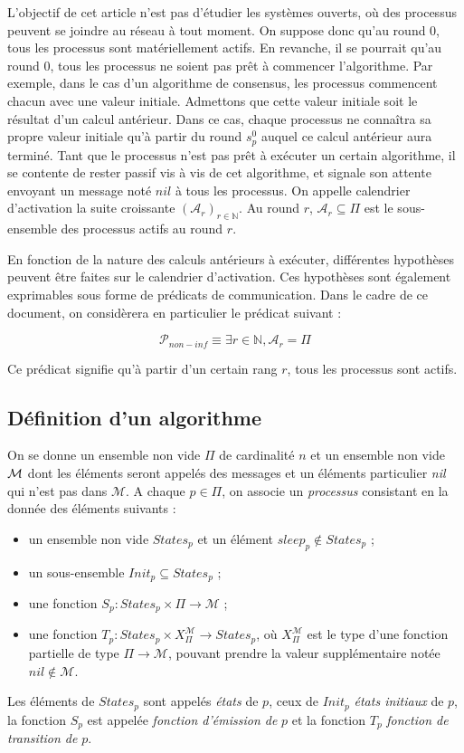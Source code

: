 \documentclass{article}
\begin{document}
L'objectif de cet article n'est pas d'étudier les systèmes ouverts, où des processus peuvent se joindre au réseau à tout moment.
On suppose donc qu'au round 0, tous les processus sont matériellement actifs. En revanche, il se pourrait qu'au round 0, tous les processus ne soient pas prêt à commencer l'algorithme.
Par exemple, dans le cas d'un algorithme de consensus, les processus commencent chacun avec une valeur initiale. Admettons que cette valeur initiale soit le résultat d'un calcul antérieur.
Dans ce cas, chaque processus ne connaîtra sa propre valeur initiale qu'à partir du round $s^0_p$ auquel ce calcul antérieur aura terminé.
Tant que le processus n'est pas prêt à exécuter un certain algorithme, il se contente de rester passif vis à vis de cet algorithme,
et signale son attente envoyant un message noté $nil$ à tous les processus.
On appelle calendrier d'activation la suite croissante $(\mathcal{A}_r)_{r \in \mathds{N}}$. Au round $r$, $\mathcal{A}_r \subseteq \Pi$ est le sous-ensemble des processus actifs au round $r$.

En fonction de la nature des calculs antérieurs à exécuter, différentes hypothèses peuvent être faites sur le calendrier d'activation.
Ces hypothèses sont également exprimables sous forme de prédicats de communication.
Dans le cadre de ce document, on considèrera en particulier le prédicat suivant :

$$\mathcal{P}_{non-inf} \equiv \exists r \in \mathds{N}, \mathcal{A}_r = \Pi$$

Ce prédicat signifie qu'à partir d'un certain rang $r$, tous les processus sont actifs.

\subsection{Définition d'un algorithme}

On se donne un ensemble non vide $\Pi$ de cardinalité $n$ et  un ensemble non vide ${\cal M}$ dont les éléments seront appel\'es des
	messages et un éléments particulier {\em nil} qui n'est pas dans $\mathcal{M}$.
A chaque  $p \in \Pi$,  on associe  un {\em processus} consistant en la donnée des éléments suivants :
	\begin{itemize}
	\item un ensemble non vide $States_p$ et un  \'el\'ement $sleep_p \notin States_p$ ;
	\item un sous-ensemble   $Init_p \subseteq States_p$ ;
	\item une fonction $S_p : States_p \times \Pi \rightarrow \mathcal{M}$ ;
	\item une fonction 
		$T_p : States_p \times X_\Pi^\mathcal{M}
	  \rightarrow States_p$,
	  où  $X_\Pi^\mathcal{M}$ est le type d'une fonction partielle
			de type $\Pi \rightarrow \mathcal{M}$, pouvant prendre la valeur supplémentaire notée $nil \notin \mathcal{M}$.
	\end{itemize}
Les éléments de 	$States_p$  sont appel\'es \emph{\'etats} de $p$, ceux de $Init_p$ \emph{\'etats initiaux} de $p$,
	la fonction $S_p$ est appel\'ee \emph{fonction d'émission de} $p$ et la fonction $T_p$ \emph{fonction de transition de} $p$.
\end{document}
